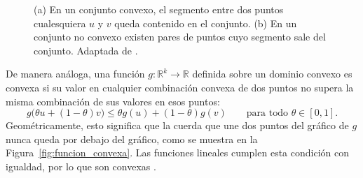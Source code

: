 \begin{figure}[H]
    \centering
    \caption[Conjunto convexo y conjunto no convexo.]{(a) En un conjunto convexo, el segmento entre dos puntos cualesquiera $u$ y $v$
    queda contenido en el conjunto. (b) En un conjunto no convexo existen pares de puntos cuyo
    segmento sale del conjunto. Adaptada de
    \textcite[p.~24]{boydConvexOptimization2004}.}
    \label{fig:conjunto_convexo}
\end{figure}

De manera análoga, una función $g : \mathbb{R}^k \to \mathbb{R}$ definida sobre un dominio convexo
es convexa si su valor en cualquier combinación convexa de dos puntos no supera la misma
combinación de sus valores en esos puntos:
\[
    g\bigl(\theta u + (1-\theta) v\bigr) \leq \theta g(u) + (1-\theta) g(v)
    \qquad \text{para todo } \theta \in [0,1].
\]
Geométricamente, esto significa que la cuerda que une dos puntos del gráfico de $g$ nunca queda
por debajo del gráfico, como se muestra en la Figura~\ref{fig:funcion_convexa}. Las funciones
lineales cumplen esta condición con igualdad, por lo que son convexas
\parencite[p.~67]{boydConvexOptimization2004}.

